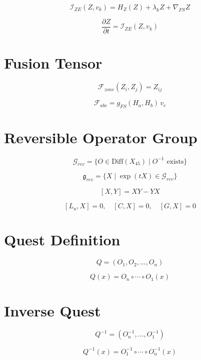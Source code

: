\[
\mathcal{I}_{ZE}(Z, v_k)
= H_Z(Z)
+ \lambda_k Z
+ \nabla_{FS} Z
\]

\[
\frac{\partial Z}{\partial t}
= \mathcal{I}_{ZE}(Z, v_k)
\]


\section*{Fusion Tensor}

\[
\mathcal{F}_{zone}(Z_i, Z_j)
= Z_{ij}
\]

\[
\mathcal{F}_{abc}
= g_{FS}(H_a, H_b)\, v_c
\]


\section*{Reversible Operator Group}

\[
\mathcal{G}_{rev}
= \{ O \in \mathrm{Diff}(X_{45}) \mid O^{-1} \text{ exists} \}
\]

\[
\mathfrak{g}_{rev}
= \{ X \mid \exp(tX) \in \mathcal{G}_{rev} \}
\]

\[
[X,Y] = XY - YX
\]

\[
[L_u, X] = 0,\quad [C, X] = 0,\quad [G, X] = 0
\]


\section*{Quest Definition}

\[
Q = (O_1, O_2, \ldots, O_n)
\]

\[
Q(x)
= O_n \circ \cdots \circ O_1 (x)
\]


\section*{Inverse Quest}

\[
Q^{-1}
= (O_n^{-1}, \ldots, O_1^{-1})
\]

\[
Q^{-1}(x)
= O_1^{-1} \circ \cdots \circ O_n^{-1}(x)
\]

